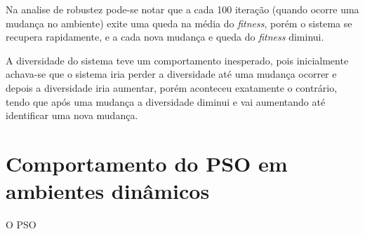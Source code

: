 Na analise de robustez pode-se notar que a cada 100 iteração (quando ocorre uma mudança no ambiente) exite uma queda na média do \textit{fitness}, porém o sistema se recupera rapidamente, e a cada nova mudança e queda do \textit{fitness} diminui.

A diversidade do sistema teve um comportamento inesperado, pois inicialmente achava-se que o sistema iria perder a diversidade até uma mudança ocorrer e depois a diversidade iria aumentar, porém aconteceu exatamente o contrário, tendo que após uma mudança a diversidade diminui e vai aumentando até identificar uma nova mudança.
\section{Comportamento do PSO em ambientes dinâmicos}
\label{sec:pso_behaviour}
O PSO\cite{carlisle2002applying}

\cite{modified_pso}
